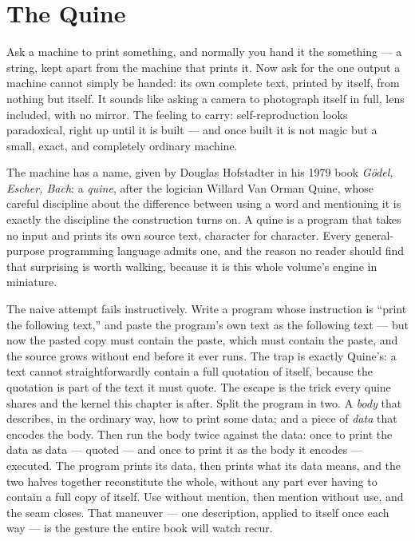 \chapter{The Quine}

\begin{intuition}
Ask a machine to print something, and normally you hand it the something
--- a string, kept apart from the machine that prints it. Now ask for the
one output a machine cannot simply be handed: its own complete text,
printed by itself, from nothing but itself. It sounds like asking a
camera to photograph itself in full, lens included, with no mirror. The
feeling to carry: self-reproduction looks paradoxical, right up until it
is built --- and once built it is not magic but a small, exact, and
completely ordinary machine.
\end{intuition}

The machine has a name, given by Douglas Hofstadter in his 1979 book
\emph{G\"odel, Escher, Bach}: a \emph{quine}, after the logician
Willard Van Orman Quine, whose careful discipline about the difference
between using a word and mentioning it is exactly the discipline the
construction turns on. A quine is a program that takes no input and
prints its own source text, character for character. Every general-purpose
programming language admits one, and the reason no reader should find
that surprising is worth walking, because it is this whole volume's engine
in miniature.

The naive attempt fails instructively. Write a program whose instruction
is ``print the following text,'' and paste the program's own text as the
following text --- but now the pasted copy must contain the paste, which
must contain the paste, and the source grows without end before it ever
runs. The trap is exactly Quine's: a text cannot straightforwardly
contain a full quotation of itself, because the quotation is part of the
text it must quote. The escape is the trick every quine shares and the
kernel this chapter is after. Split the program in two. A \emph{body}
that describes, in the ordinary way, how to print some data; and a piece
of \emph{data} that encodes the body. Then run the body twice against the
data: once to print the data as data --- quoted --- and once to print it
as the body it encodes --- executed. The program prints its data, then
prints what its data means, and the two halves together reconstitute the
whole, without any part ever having to contain a full copy of itself. Use
without mention, then mention without use, and the seam closes. That
maneuver --- one description, applied to itself once each way --- is the
gesture the entire book will watch recur.

